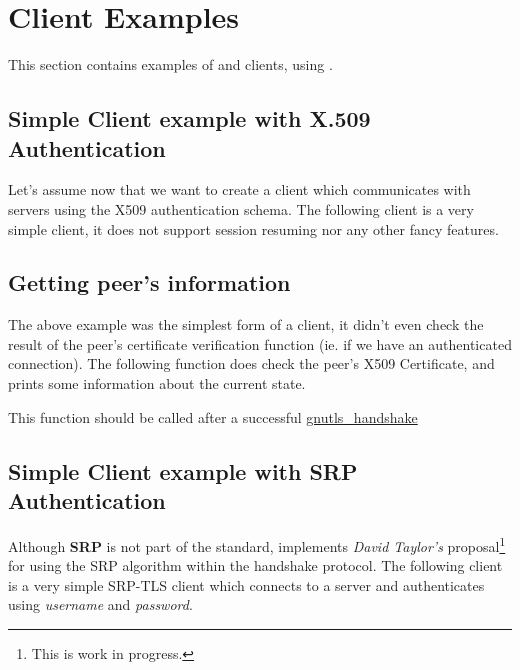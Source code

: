 \documentclass{book}
\begin{document}












\section{Client Examples}
This section contains examples of \tls{} and \ssl{} clients, using \gnutls{}. 

\subsection{Simple Client example with X.509 Authentication}
Let's assume now that we want to create a client which communicates
with servers using the X509 authentication schema. The following client
is a very simple \tls{} client, it does not support session resuming nor
any other fancy features.


\subsection{Getting peer's information}
\par The above example was the simplest form of a client, it didn't even check
the result of the peer's certificate verification function (ie. if we have
an authenticated connection). The following function does check the peer's X509
Certificate, and prints some information about the current state.
\par
This function should be called after a successful
\hyperref{gnutls\_handshake()}{gnutls\_handshake() (see Section }{)}{gnutls_handshake}





\subsection{Simple Client example with SRP Authentication}
Although {\bf SRP} is not part of the \tls{} standard, \gnutls{} implements
{\it David Taylor's} proposal\footnote{This is work in progress.}  for using the SRP algorithm
within the \tls{} handshake protocol. The following client
is a very simple SRP-TLS client which connects to a server 
and authenticates using {\it username} and {\it password}.
\end{document}
